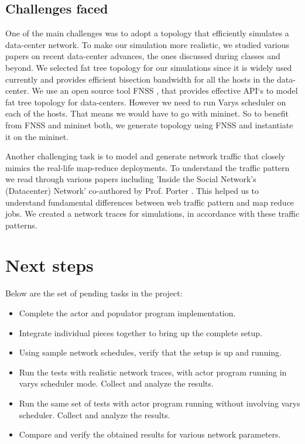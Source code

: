 \documentclass{article}
\begin{document}
\subsection{Challenges faced}
One of the main challenges was to adopt a topology that efficiently simulates a data-center network. To make our simulation more realistic, we studied various papers on recent data-center advances, the ones discussed during classes and beyond. We selected fat tree topology for our simulations since it is widely used currently and provides efficient bisection bandwidth for all the hosts in the data-center. We use an open source tool FNSS \cite{fnss}, that provides effective API`s to model fat tree topology for data-centers. However we need to run Varys scheduler on each of the hosts. That means we would have to go with mininet. So to benefit from FNSS and mininet both, we generate topology using FNSS and instantiate it on the mininet.

Another challenging task is to model and generate network traffic that closely mimics the real-life map-reduce deployments. To understand the traffic pattern we read through various papers including 'Inside the Social Network's (Datacenter) Network' co-authored by Prof. Porter \cite{facebook}. This helped us to understand fundamental differences between web traffic pattern and map reduce jobs. We created a network traces for simulations, in accordance with these traffic patterns.

\section{Next steps}

Below are the set of pending tasks in the project:

\begin{itemize}
\item Complete the actor and populator program implementation.
\item Integrate individual pieces together to bring up the complete setup.
\item Using sample network schedules, verify that the setup is up and running.
\item Run the tests with realistic network traces, with actor program running in varys scheduler mode. Collect and analyze the results.
\item Run the same set of tests with actor program running without involving varys scheduler. Collect and analyze the results.
\item Compare and verify the obtained results for various network parameters.
\end{itemize}
\end{document}
